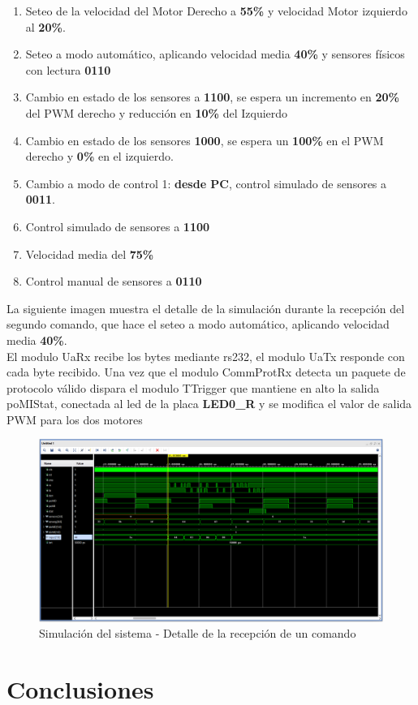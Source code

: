 \documentclass[12pt]{article}
\begin{document}
\begin{enumerate}
\footnotesize
\item Seteo de la velocidad del Motor Derecho a \textbf{55\%} y velocidad Motor izquierdo al \textbf{20\%}.
\item Seteo a modo automático, aplicando velocidad media \textbf{40\%} y sensores físicos con lectura \textbf{0110}
\item Cambio en estado de los sensores a \textbf{1100}, se espera un incremento en \textbf{20\%} del PWM derecho y reducción en \textbf{10\%} del Izquierdo 
\item Cambio en estado de los sensores \textbf{1000}, se espera un \textbf{100\%} en el PWM derecho y \textbf{0\%} en el izquierdo.
\item Cambio a modo de control 1: \textbf{desde PC}, control simulado de sensores a \textbf{0011}.
\item Control simulado de sensores a \textbf{1100}
\item Velocidad media del \textbf{75\%}
\item Control manual de sensores a \textbf{0110}
\end{enumerate}

La siguiente imagen muestra el detalle de la simulación durante la recepción del segundo comando, que hace el seteo a modo automático, aplicando velocidad media \textbf{40\%}.
\\

El modulo UaRx recibe los bytes mediante rs232, el modulo UaTx responde con cada byte recibido. Una vez que el modulo CommProtRx detecta un paquete de protocolo válido dispara el modulo TTrigger que mantiene en alto la salida poMIStat, conectada al led de la placa \textbf{LED0\_R} y se modifica el valor de salida PWM para los dos motores

\begin{figure}[H]
    \centering
    \includegraphics[width=\textwidth]{sim-cmd}
    \caption{Simulación del sistema - Detalle de la recepción de un comando}
\end{figure}
\section{Conclusiones}
\end{document}
